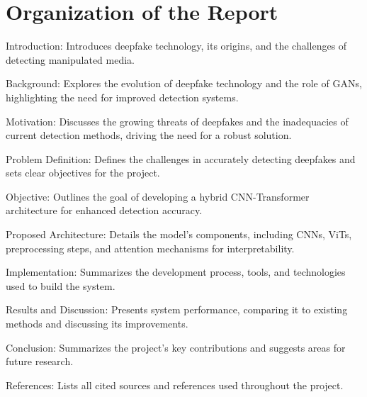 \section{Organization of the Report}
Introduction: Introduces deepfake technology, its origins, and the challenges of detecting manipulated media.

\noindent Background: Explores the evolution of deepfake technology and the role of GANs, highlighting the need for improved detection systems.

\noindent Motivation: Discusses the growing threats of deepfakes and the inadequacies of current detection methods, driving the need for a robust solution.

\noindent Problem Definition: Defines the challenges in accurately detecting deepfakes and sets clear objectives for the project.

\noindent Objective: Outlines the goal of developing a hybrid CNN-Transformer architecture for enhanced detection accuracy.

\noindent Proposed Architecture: Details the model’s components, including CNNs, ViTs, preprocessing steps, and attention mechanisms for interpretability.

\noindent Implementation: Summarizes the development process, tools, and technologies used to build the system.

\noindent Results and Discussion: Presents system performance, comparing it to existing methods and discussing its improvements.

\noindent Conclusion: Summarizes the project’s key contributions and suggests areas for future research.

\noindent References: Lists all cited sources and references used throughout the project.
